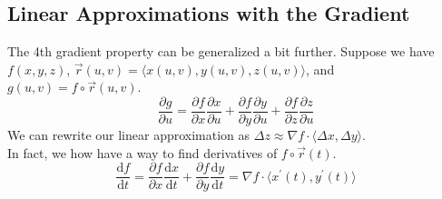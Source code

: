 \subsection{Linear Approximations with the Gradient}
\noindent
The 4th gradient property can be generalized a bit further. Suppose we have $f(x,y,z)$, $\vec{r}(u,v)=\langle x(u,v), y(u,v), z(u,v)\rangle$, and $g(u,v)=f\circ\vec{r}(u,v)$.
$$\frac{\partial g}{\partial u}=\frac{\partial f}{\partial x}\frac{\partial x}{\partial u}+\frac{\partial f}{\partial y}\frac{\partial y}{\partial u}+\frac{\partial f}{\partial z}\frac{\partial z}{\partial u}$$
\noindent
We can rewrite our linear approximation as $\Delta z\approx\nabla f\cdot\langle \Delta x, \Delta y\rangle$.\\
In fact, we how have a way to find derivatives of $f\circ\vec{r}(t)$.
$$\frac{\mathrm{d}f}{\mathrm{d}t}=\frac{\partial f}{\partial x}\frac{\mathrm{d}x}{\mathrm{d}t}+\frac{\partial f}{\partial y}\frac{\mathrm{d}y}{\mathrm{d}t}=\nabla f\cdot\langle x^{\prime}(t),y^{\prime}(t)\rangle$$